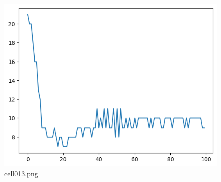 \begin{figure}[ht]
	\centering
	\includegraphics[scale=0.8, max width=\linewidth]{./fig/local-learning-rule/logistic-regression-perceptron/cell013.png}
	\caption{cell013.png}
	\label{cell013.png}
\end{figure}